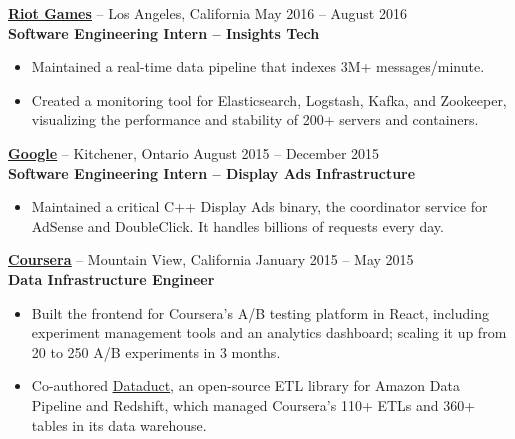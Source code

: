 \documentclass{letter}
\begin{document}
\vspace{-1.5mm}
{\bfseries \href{http://riotgames.com}{\uline{Riot Games}}} -- Los Angeles,
California \hfill May 2016 -- August 2016\\
{\bfseries Software Engineering Intern -- Insights Tech}
\vspace{-3mm}
\begin{itemize}
    \item Maintained a real-time data pipeline that indexes 3M+ messages/minute.
    \item Created a monitoring tool for Elasticsearch, Logstash, Kafka, and
      Zookeeper, visualizing the performance and stability of 200+ servers and
      containers.
\end{itemize}

\vspace{-1.5mm}
{\bfseries \href{https://www.google.com}{\uline{Google}}} -- Kitchener, Ontario \hfill August 2015 -- December 2015\\
{\bfseries Software Engineering Intern -- Display Ads Infrastructure}
\vspace{-3mm}
\begin{itemize}
    \item Maintained a critical C++ Display Ads binary, the coordinator service
      for AdSense and DoubleClick. It handles billions of requests every day.
\end{itemize}

\vspace{-1.5mm}
{\bfseries \href{https://www.coursera.org}{\uline{Coursera}}} -- Mountain View, California \hfill January 2015 -- May 2015 \\
{\bfseries Data Infrastructure Engineer}
\vspace{-3mm}
\begin{itemize}
    \item Built the frontend for Coursera's A/B testing platform in React,
      including experiment management tools and an analytics dashboard; scaling
      it up from 20 to 250 A/B experiments in 3 months.
    \item Co-authored \href{https://github.com/coursera/dataduct}{\uline{Dataduct}},
      an open-source ETL library for Amazon Data Pipeline and Redshift, which
      managed Coursera's 110+ ETLs and 360+ tables in its data warehouse.
\end{itemize}
\end{document}

